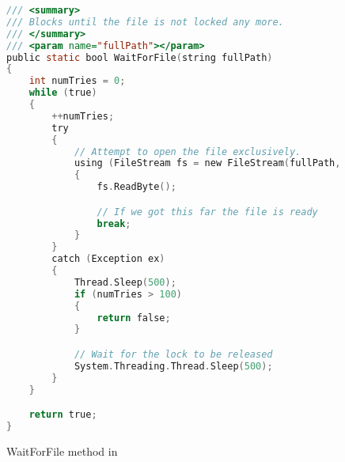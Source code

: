 
\label{WaitForFile Method}


\begin{figure}
\begin{lstlisting}[language=C]
/// <summary>
/// Blocks until the file is not locked any more.
/// </summary>
/// <param name="fullPath"></param>
public static bool WaitForFile(string fullPath)
{
	int numTries = 0;
	while (true)
	{
		++numTries;
		try
		{
			// Attempt to open the file exclusively.
			using (FileStream fs = new FileStream(fullPath,	 FileMode.Open, FileAccess.ReadWrite, FileShare.None, 100))
			{
				fs.ReadByte();

				// If we got this far the file is ready
				break;
			}
		}
		catch (Exception ex)
		{
			Thread.Sleep(500);
			if (numTries > 100)
			{
				return false;
			}

			// Wait for the lock to be released
			System.Threading.Thread.Sleep(500);
		}
	}

	return true;
}
\end{lstlisting}
\caption{WaitForFile method in \mytool}
\label{fig:WaitForFile1}
\end{figure}

